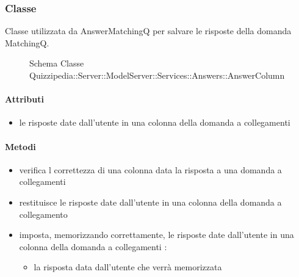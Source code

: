 \subsubsection{Classe }
Classe utilizzata da AnswerMatchingQ per salvare le risposte della domanda MatchingQ.
\begin{figure}[H]
\centering
\noindent{}
\caption[Schema Classe AnswerColumn]{Schema Classe Quizzipedia::Server::ModelServer::Services::Answers::AnswerColumn}
\end{figure}
\paragraph{Attributi}
\begin{itemize}
\item {}
\newline
le risposte date dall'utente in una colonna della domanda a collegamenti
\end{itemize}
\paragraph{Metodi}
\begin{itemize}
\item {}
\newline
verifica l correttezza di una colonna data la risposta a una domanda a collegamenti
\newline
\item {}
\newline
restituisce le risposte date dall'utente in una colonna della domanda a collegamento
\newline
\item {}
\newline
imposta, memorizzando correttamente, le risposte date dall'utente in una colonna della domanda a collegamenti
\newline
{} :
\begin{itemize}
\item {}
\newline
la risposta data dall'utente che verrà memorizzata
\end{itemize}
\end{itemize}
